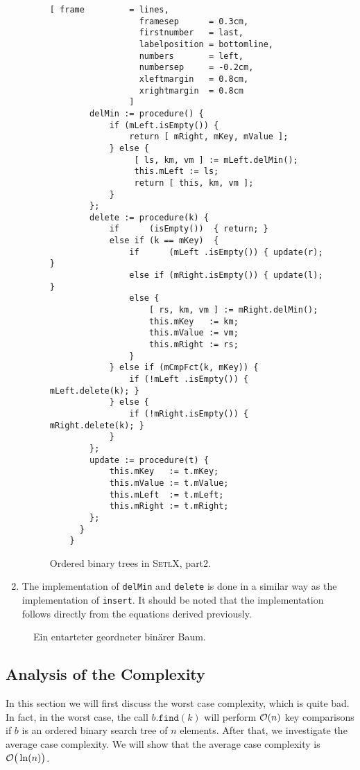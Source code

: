 \begin{enumerate}
\begin{figure}[!ht]
  \centering
\begin{Verbatim}[ frame         = lines, 
                  framesep      = 0.3cm, 
                  firstnumber   = last,
                  labelposition = bottomline,
                  numbers       = left,
                  numbersep     = -0.2cm,
                  xleftmargin   = 0.8cm,
                  xrightmargin  = 0.8cm
                ]
        delMin := procedure() {
            if (mLeft.isEmpty()) { 
                return [ mRight, mKey, mValue ]; 
            } else {
                 [ ls, km, vm ] := mLeft.delMin();
                 this.mLeft := ls;
                 return [ this, km, vm ];
            }
        };
        delete := procedure(k) {
            if      (isEmpty())  { return; } 
            else if (k == mKey)  {
                if      (mLeft .isEmpty()) { update(r); }  
                else if (mRight.isEmpty()) { update(l); } 
                else {
                    [ rs, km, vm ] := mRight.delMin();
                    this.mKey   := km;
                    this.mValue := vm; 
                    this.mRight := rs;
                }
            } else if (mCmpFct(k, mKey)) {
                if (!mLeft .isEmpty()) { mLeft.delete(k); }
            } else {
                if (!mRight.isEmpty()) { mRight.delete(k); }
            }
        };
        update := procedure(t) {
            this.mKey   := t.mKey;
            this.mValue := t.mValue;
            this.mLeft  := t.mLeft;
            this.mRight := t.mRight;
        };
      }
    }
\end{Verbatim}
\vspace*{-0.3cm}
  \caption{Ordered binary trees in \textsc{SetlX}, part2.}
  \label{fig:binary-tree.stlx-2}
\end{figure}

\item The implementation of \texttt{delMin} and \texttt{delete} is done in a similar way as the
      implementation of \texttt{insert}.  It should be noted that the implementation follows directly from the
      equations derived  previously. 
\end{enumerate}

\begin{figure}[!th]
  \centering 
  \caption{Ein entarteter  geordneter bin\"arer Baum.}
  \label{fig:degenerated}
\end{figure}


\subsection{Analysis of the Complexity}
In this section we will first discuss the worst case complexity, which is quite bad.  In fact, in
the worst case, the call $b.\mathtt{find}(k)$ will perform $\mathcal{O}(n)$ key comparisons if $b$ is an ordered
binary search tree of $n$ elements.  After that, we investigate the average case complexity.  We
will show that the average case complexity is $\mathcal{O}\bigr(\ln(n)\bigr)$.

